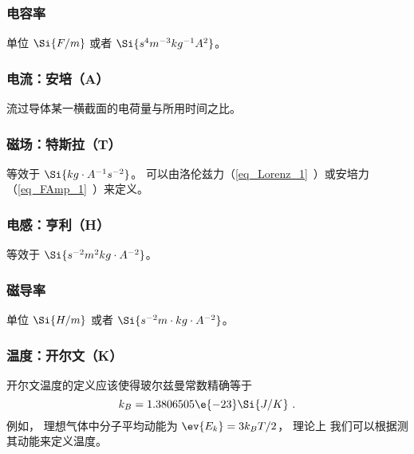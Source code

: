 \subsubsection{电容率}
单位 $\Si{F/m}$ 或者 $\Si{s^4 m^{-3} kg^{-1} A^2}$。

\subsubsection{电流：安培（A）}
流过导体某一横截面的电荷量与所用时间之比。

\subsubsection{磁场：特斯拉（T）}
等效于 $\Si{kg\cdot A^{-1}s^{-2}}$。 可以由洛伦兹力（\autoref{eq_Lorenz_1}~）或安培力（\autoref{eq_FAmp_1}~）来定义。

\subsubsection{电感：亨利（H）}
等效于 $\Si{ s^{-2}m^2 kg \cdot A^{-2}}$。

\subsubsection{磁导率}
单位 $\Si{H/m}$ 或者 $\Si{s^{-2} m \cdot kg \cdot A^{-2}}$。

\subsubsection{温度：开尔文（K）}
开尔文温度的定义应该使得玻尔兹曼常数精确等于
\begin{equation}
k_B = 1.3806505\e{-23} \Si{J/K}~.
\end{equation}
例如， 理想气体中分子平均动能为 $\ev{E_k} = 3 k_B T/2$， 理论上 我们可以根据测其动能来定义温度。
